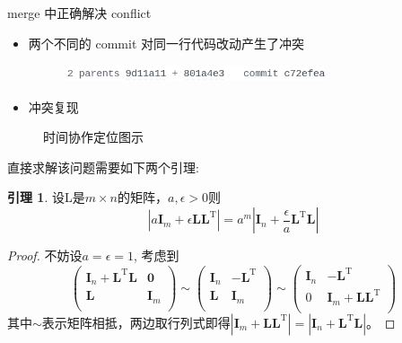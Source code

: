 \documentclass[notheorems,xetex]{beamer}
\theoremstyle{definition}
\newtheorem{lemma}{引理}
\begin{document}
\begin{frame}{merge 中正确解决 conflict}
\begin{itemize}
\item 两个不同的 commit 对同一行代码改动产生了冲突
     \begin{figure}
	\centering
	\includegraphics[height=0.5cm]{conflict.png}
	\end{figure}
\item 冲突复现
\end{itemize}
     \begin{figure}
          \centering
          \caption*{时间协作定位图示}
     \end{figure}
\end{frame}
\appendix
\begin{frame}[noframenumbering]
直接求解该问题需要如下两个引理:
\begin{lemma}\label{lemma:change}
设L是$m\times n$的矩阵，$a,\epsilon > 0$则
\begin{equation*}
|a\bm{I}_m+\epsilon \bm{L}\bm{L}^{\textrm{T}}|=a^m|\bm{I}_n+\frac{\epsilon}{a} \bm{L}^{\textrm{T}}\bm{L}|
\end{equation*}
\end{lemma}
\begin{proof}
不妨设$a=\epsilon=1$,
考虑到
\[
\left(\begin{array}{cc}
\bm{I}_n+\bm{L}^{\textrm{T}}\bm{L}&\bm{0}\\
\bm{L}&\bm{I}_m\\
\end{array}\right)\sim\left(\begin{array}{cc}
\bm{I}_n&-\bm{L}^{\textrm{T}}\\
\bm{L}&\bm{I}_m\\
\end{array}\right)\sim\left(\begin{array}{cc}
\bm{I}_n&-\bm{L}^{\textrm{T}}\\
0&\bm{I}_m+\bm{L}\bm{L}^{\textrm{T}}\\
\end{array}\right)
\]
其中$\sim$表示矩阵相抵，两边取行列式即得$|\bm{I}_m+\bm{L}\bm{L}^{\textrm{T}}|=|\bm{I}_n+\bm{L}^{\textrm{T}}\bm{L}|$。
\end{proof}
\end{frame}
\end{document}
